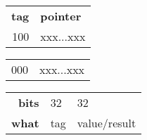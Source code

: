 


  \begin{tabular}{rl}
    \textbf{tag} & \textbf{pointer} \\
    \textsf{100} & \textsf{xxx...xxx}
  \end{tabular}

  \begin{tabular}{rl}
    \textsf{000} & \textsf{xxx...xxx}
  \end{tabular}

  \begin{tabular}{rll}
    \textbf{bits} & 32  & 32 \\
    \textbf{what} & tag & value/result
  \end{tabular}

